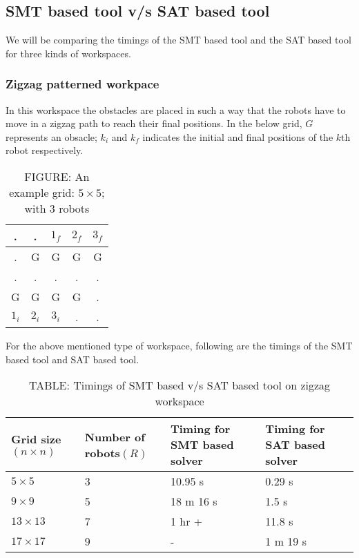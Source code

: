 \documentclass{article}[11pt]
\begin{document}
		\subsection{SMT based tool v/s SAT based tool}
		We will be comparing the timings of the SMT based tool and the SAT based tool for three kinds of workspaces.
			\subsubsection{Zigzag patterned workpace}
			In this workspace the obstacles are placed in such a way that the robots have to move in a zigzag path to reach their final positions. In the below grid, $G$ represents an obsacle; $k_i$ and $k_f$ indicates the initial and final positions of the $k$th robot respectively.
				\begin{table}[h!]
				\centering
				\begin{tabular}{| c | c | c | c | c |} 
				 \hline
				 . & . & $1_f$ & $2_f$ & $3_f$ \\ 
				 \hline
				 . & G & G & G & G \\
				 \hline
				 . & . & . & . & . \\
				 \hline
				 G & G & G & G & . \\
				 \hline
				 $1_i$ & $2_i$ & $3_i$ & . & . \\ [1ex] 
				 \hline
				\end{tabular}
				\caption*{FIGURE: An example grid: $5\times 5$; with 3 robots}
				\end{table}

			For the above mentioned type of workspace, following are the timings of the SMT based tool and SAT based tool.
				\begin{table}[h!]
				\centering
				\begin{tabular}{|| p{2cm} | p{2cm} | p{2cm} | p{2cm} ||} 
				 \hline\hline
				 Grid size$(n \times n)$ & Number of robots$(R)$ & Timing for SMT based solver & Timing for SAT based solver \\ [0.5ex] 
				 \hline\hline
				 $5 \times 5$ & 3 & 10.95 s & 0.29 s \\ 
				 $9 \times 9$ & 5 & 18 m 16 s & 1.5 s \\
				 $13 \times 13$ & 7 & 1 hr + & 11.8 s \\
				 $17 \times 17$ & 9 & - & 1 m 19 s  \\ [1ex]
				 \hline
				\end{tabular}
				\caption*{TABLE: Timings of SMT based v/s SAT based tool on zigzag workspace}
				\end{table}
\end{document}
